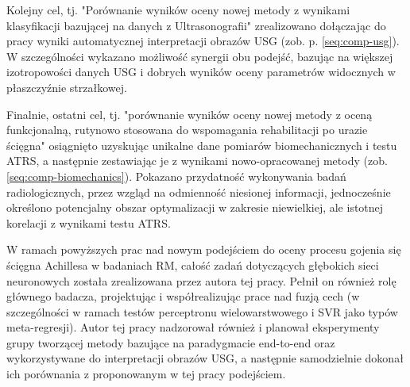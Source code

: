 Kolejny cel, tj. "Porównanie wyników oceny nowej metody z wynikami klasyfikacji bazującej na danych z Ultrasonografii" zrealizowano dołączając do pracy wyniki automatycznej interpretacji obrazów USG (zob. p. \ref{seq:comp-usg}). W szczególności wykazano możliwość synergii obu podejść, bazując na większej izotropowości danych USG i dobrych wyników oceny parametrów widocznych w płaszczyźnie strzałkowej.

Finalnie, ostatni cel, tj. "porównanie wyników oceny nowej metody z oceną funkcjonalną, rutynowo stosowana do wspomagania rehabilitacji po urazie ścięgna" osiągnięto uzyskując unikalne dane pomiarów biomechanicznych i testu ATRS, a następnie zestawiając je z wynikami nowo-opracowanej metody (zob. \ref{seq:comp-biomechanics}). Pokazano przydatność wykonywania badań radiologicznych, przez wzgląd na odmienność niesionej informacji, jednocześnie określono potencjalny obszar optymalizacji w zakresie niewielkiej, ale istotnej korelacji z wynikami testu ATRS.  

W ramach powyższych prac nad nowym podejściem do oceny procesu gojenia się ścięgna Achillesa w badaniach RM, całość zadań dotyczących głębokich sieci neuronowych została zrealizowana przez autora tej pracy. Pełnił on również rolę głównego badacza, projektując i współrealizując prace nad fuzją cech (w szczególności w ramach testów perceptronu wielowarstwowego i SVR jako typów meta-regresji). Autor tej pracy nadzorował również i planował eksperymenty grupy tworzącej metody bazujące na paradygmacie end-to-end oraz wykorzystywane do interpretacji obrazów USG, a następnie samodzielnie dokonał ich porównania z proponowanym w tej pracy podejściem. 

